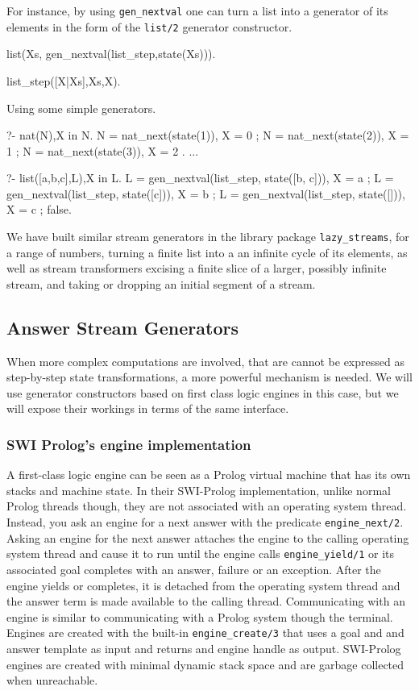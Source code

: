 \documentclass{new_tlp}
\begin{document}
For instance, by using {\tt gen\_nextval} one can turn a list into a generator of its elements  in the form of the {\tt list/2} generator constructor.
\begin{code}
list(Xs, gen_nextval(list_step,state(Xs))).

list_step([X|Xs],Xs,X).
\end{code}

\BX
Using some simple generators.
\begin{codex}
?- nat(N),X in N.
N = nat_next(state(1)), X = 0 ;
N = nat_next(state(2)), X = 1 ;
N = nat_next(state(3)), X = 2 .
...

?- list([a,b,c],L),X in L.
L = gen_nextval(list_step, state([b, c])), X = a ;
L = gen_nextval(list_step, state([c])), X = b ;
L = gen_nextval(list_step, state([])), X = c ;
false.
\end{codex}
\EX

We have built similar stream generators in the library package 
{\tt lazy\_streams}, for a range of numbers, turning a finite list into
a an infinite cycle of its elements, as well as stream 
transformers excising a finite slice of a larger, possibly infinite stream,
and taking or dropping an initial segment of a stream.

\subsection{Answer Stream Generators}

When more complex computations are involved, that are cannot be expressed as step-by-step state transformations, a more powerful mechanism is needed. We will use generator constructors based on first class logic engines in this case, but we will expose their workings in terms of the same interface.

\subsubsection{SWI Prolog's engine implementation}

A first-class logic engine \cite{tarau:cl2000,bp2011} can be seen as a Prolog virtual machine that has its own stacks and machine state. 
In their SWI-Prolog implementation, unlike normal Prolog threads \cite{swi,swi_threads} though, they are not associated with an operating system thread. Instead, you ask an engine for a next answer with the predicate {\tt engine\_next/2}. Asking an engine for the next answer attaches the engine to the calling operating system thread and cause it to run until the engine calls {\tt engine\_yield/1} or its associated goal completes with an answer, failure or an exception. After the engine yields or completes, it is detached from the operating system thread and the answer term is made available to the calling thread. Communicating with an engine is similar to communicating with a Prolog system though the terminal. Engines are created with the built-in {\tt engine\_create/3} that uses a goal and and answer template as input and returns and engine handle as output. SWI-Prolog engines are created with minimal dynamic stack space and are garbage collected when unreachable.
\end{document}
